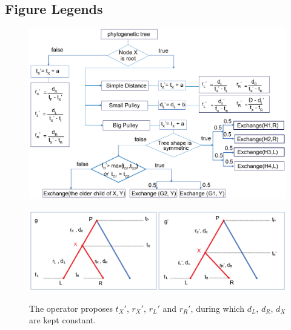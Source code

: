 \documentclass{bmcart}
\begin{document}
\begin{backmatter}



\section*{Figure Legends}
\begin{figure}[h!]
\includegraphics[width=12cm]{Fig01-flowchart.eps}\\
\caption{}
\label{flowchart}
\end{figure}

\begin{figure}[h!]
\includegraphics[width=12cm]{Fig02-internalnode.eps}\\
\caption{
             The operator proposes ${t_X}'$, ${r_X}'$, ${r_L}'$ and ${r_R}'$, during which $d_L$, $d_R$, $d_X$ are kept constant.}
\label{internalnodes}
\end{figure}


\end{backmatter}
\end{document}
